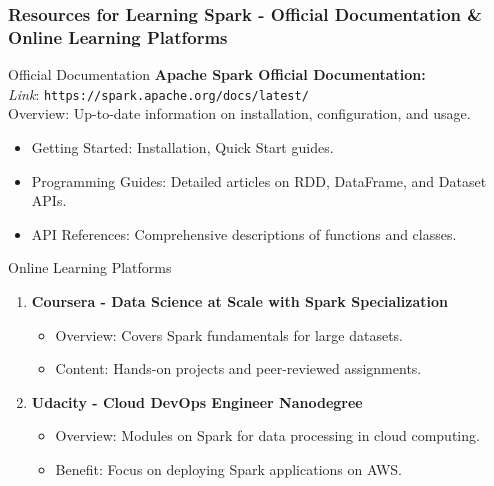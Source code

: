 \documentclass[aspectratio=169]{beamer}
\begin{document}
\begin{frame}[fragile]
    \frametitle{Resources for Learning Spark - Official Documentation & Online Learning Platforms}
    \begin{block}{Official Documentation}
        \textbf{Apache Spark Official Documentation:} \\
        \textit{Link}: \texttt{https://spark.apache.org/docs/latest/} \\
        Overview: Up-to-date information on installation, configuration, and usage.
        \begin{itemize}
            \item Getting Started: Installation, Quick Start guides.
            \item Programming Guides: Detailed articles on RDD, DataFrame, and Dataset APIs.
            \item API References: Comprehensive descriptions of functions and classes.
        \end{itemize}
    \end{block}
    
    \begin{block}{Online Learning Platforms}
        \begin{enumerate}
            \item \textbf{Coursera - Data Science at Scale with Spark Specialization}
                \begin{itemize}
                    \item Overview: Covers Spark fundamentals for large datasets.
                    \item Content: Hands-on projects and peer-reviewed assignments.
                \end{itemize}
            \item \textbf{Udacity - Cloud DevOps Engineer Nanodegree}
                \begin{itemize}
                    \item Overview: Modules on Spark for data processing in cloud computing.
                    \item Benefit: Focus on deploying Spark applications on AWS.
                \end{itemize}
        \end{enumerate}
    \end{block}
\end{frame}
\end{document}
